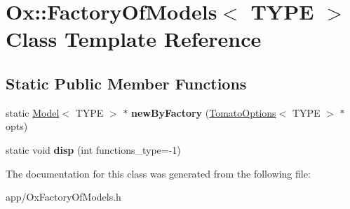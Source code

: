 \hypertarget{class_ox_1_1_factory_of_models}{\section{Ox\-:\-:Factory\-Of\-Models$<$ T\-Y\-P\-E $>$ Class Template Reference}
\label{class_ox_1_1_factory_of_models}
}
\subsection*{Static Public Member Functions}
\begin{DoxyCompactItemize}
\item 
\hypertarget{class_ox_1_1_factory_of_models_a8aa8c31ff21f77ba4134098f68525c95}{static \hyperlink{class_ox_1_1_model}{Model}$<$ T\-Y\-P\-E $>$ $\ast$ {\bfseries new\-By\-Factory} (\hyperlink{struct_ox_1_1_tomato_options}{Tomato\-Options}$<$ T\-Y\-P\-E $>$ $\ast$opts)}\label{class_ox_1_1_factory_of_models_a8aa8c31ff21f77ba4134098f68525c95}

\item 
\hypertarget{class_ox_1_1_factory_of_models_aaf2ce113d7cdae3b10dc9a0a0b44ce95}{static void {\bfseries disp} (int functions\-\_\-type=-\/1)}\label{class_ox_1_1_factory_of_models_aaf2ce113d7cdae3b10dc9a0a0b44ce95}

\end{DoxyCompactItemize}


The documentation for this class was generated from the following file\-:\begin{DoxyCompactItemize}
\item 
app/Ox\-Factory\-Of\-Models.\-h\end{DoxyCompactItemize}

